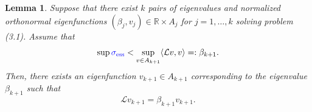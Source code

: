 \documentclass[12pt, a4paper]{article}
\newcommand{\revision}[1]{\textcolor{blue}{#1}}
\theoremstyle{break}
\theoremstyle{break}
\theoremstyle{break}
\theoremstyle{break}
\theoremstyle{break}
\newtheorem{lem}{Lemma}[section]
\theoremstyle{break}
\theoremstyle{break}
\theoremstyle{break}
\theoremstyle{break}
\begin{document}
\begin{lem}
    \label{lem:inductive_step}
    Suppose that there exist $k$ pairs of eigenvalues and normalized orthonormal eigenfunctions $(\beta_j, v_j) \in \mathbb{R} \times A_j$ for $j=1, \ldots, k$ solving problem (3.1). Assume that
    \begin{equation}
        \label{eq:next_beta_inequality}
        \sup \revision{\sigma_{\mathrm{ess}}} < \sup_{v \in A_{k+1}} \langle \mathcal{L}v, v \rangle =: \beta_{k+1}.
    \end{equation}
    Then, there exists an eigenfunction $v_{k+1} \in A_{k+1}$ corresponding to the eigenvalue $\beta_{k+1}$ such that
    \begin{equation}
        \label{eq:next_eigenproblem_solution}
        \mathcal{L}v_{k+1} = \beta_{k+1} v_{k+1}.
    \end{equation}
\end{lem}
\end{document}
